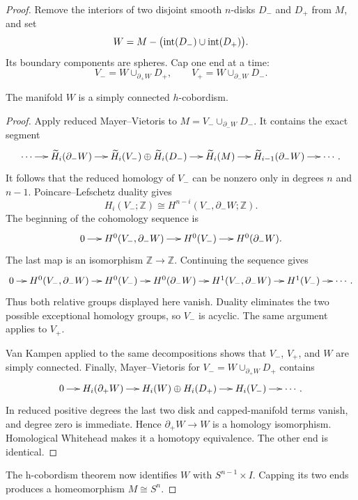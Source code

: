 \begin{proof}
Remove the interiors of two disjoint smooth
$n$-disks $D_-$ and $D_+$ from $M$, and set
$$
W=M-\bigl(
\mathop{\rm int}(D_-)
\cup\mathop{\rm int}(D_+)
\bigr).
$$
Its boundary components are spheres.  Cap one
end at a time:
$$
V_-=W\cup_{\partial_+W}D_+,
\qquad
V_+=W\cup_{\partial_-W}D_-.
$$

\begin{lemma}
\label{at-lemma-punctured-sphere-h-cobordism}
The manifold $W$ is a simply connected
$h$-cobordism.
\end{lemma}

\begin{proof}
Apply reduced Mayer--Vietoris to
$M=V_-\cup_{\partial_-W}D_-$.  It contains
the exact segment
$$
\xymatrix@C=13pt{
\cdots\ar[r]&
\widetilde H_i(\partial_-W)\ar[r]&
\widetilde H_i(V_-)\oplus
\widetilde H_i(D_-)\ar[r]&
\widetilde H_i(M)\ar[r]&
\widetilde H_{i-1}(\partial_-W)
\ar[r]&\cdots .
}
$$
It follows that the reduced homology of
$V_-$ can be nonzero only in degrees $n$ and
$n-1$.  Poincare--Lefschetz duality gives
$$
H_i(V_-;\mathbb{Z})
\cong H^{n-i}(V_-,\partial_-W;
\mathbb{Z}).
$$
The beginning of the cohomology sequence is
$$
\xymatrix@C=14pt{
0\ar[r]&H^0(V_-,\partial_-W)\ar[r]&
H^0(V_-)\ar[r]&H^0(\partial_-W).
}
$$
The last map is an isomorphism
$\mathbb{Z}\longrightarrow\mathbb{Z}$.
Continuing the sequence gives
$$
\xymatrix@C=10pt{
0\ar[r]&H^0(V_-,\partial_-W)\ar[r]&
H^0(V_-)\ar[r]&H^0(\partial_-W)
\ar[r]&H^1(V_-,\partial_-W)\ar[r]&
H^1(V_-)\ar[r]&\cdots .
}
$$
Thus both relative groups displayed here
vanish.  Duality eliminates the two possible
exceptional homology groups, so $V_-$ is
acyclic.  The same argument applies to $V_+$.

Van Kampen applied to the same decompositions
shows that $V_-$, $V_+$, and $W$ are simply
connected.  Finally, Mayer--Vietoris for
$V_-=W\cup_{\partial_+W}D_+$ contains
$$
\xymatrix@C=13pt{
0\ar[r]&H_i(\partial_+W)\ar[r]&
H_i(W)\oplus H_i(D_+)\ar[r]&
H_i(V_-)\ar[r]&\cdots .
}
$$
In reduced positive degrees the last two disk
and capped-manifold terms vanish, and degree
zero is immediate.  Hence
$\partial_+W\longrightarrow W$ is a homology
isomorphism.  Homological Whitehead makes it
a homotopy equivalence.  The other end is
identical.
\end{proof}

The h-cobordism theorem now identifies $W$
with $S^{n-1}\times I$.  Capping its two ends
produces a homeomorphism $M\cong S^n$.
\end{proof}


